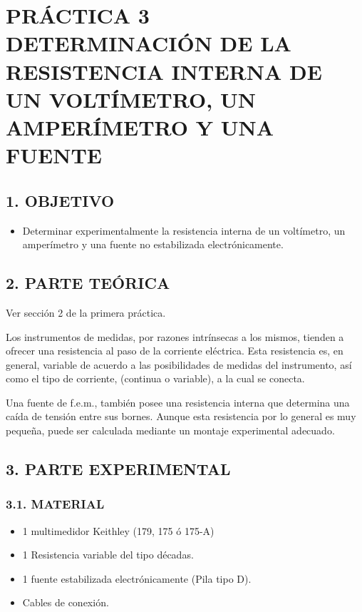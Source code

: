 \documentclass[12pt, a4paper]{article}
\begin{document}
\newpage

\section*{\centering PRÁCTICA 3 \\ DETERMINACIÓN DE LA RESISTENCIA INTERNA DE UN VOLTÍMETRO, UN AMPERÍMETRO Y UNA FUENTE}
 
\subsection*{1. OBJETIVO}
\begin{itemize}
    \item Determinar experimentalmente la resistencia interna de un voltímetro, un amperímetro y una fuente no 
    estabilizada electrónicamente.
\end{itemize}

\subsection*{2. PARTE TEÓRICA}
Ver sección 2 de la primera práctica.

Los instrumentos de medidas, por razones intrínsecas a los mismos, tienden a ofrecer una resistencia al paso de la corriente 
eléctrica. Esta resistencia es, en general, variable de acuerdo a las posibilidades de medidas del instrumento, así como el 
tipo de corriente, (continua o variable), a la cual se conecta.

Una fuente de f.e.m., también posee una resistencia interna que determina una caída de tensión entre sus bornes. Aunque esta 
resistencia por lo general es muy pequeña, puede ser calculada mediante un montaje experimental adecuado.

\subsection*{3. PARTE EXPERIMENTAL}

\subsubsection*{3.1. MATERIAL}
\begin{itemize}
    \item 1 multimedidor Keithley (179, 175 ó 175-A)
    \item 1 Resistencia variable del tipo décadas.
    \item 1 fuente estabilizada electrónicamente (Pila tipo D).
    \item Cables de conexión.
\end{itemize}
\end{document}
